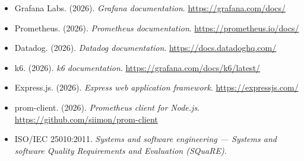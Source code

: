 \documentclass[12pt, a4paper]{article}
\begin{document}
\begin{itemize}
    \item Grafana Labs. (2026). \textit{Grafana documentation}. \url{https://grafana.com/docs/}
    
    \item Prometheus. (2026). \textit{Prometheus documentation}. \url{https://prometheus.io/docs/}
    
    \item Datadog. (2026). \textit{Datadog documentation}. \url{https://docs.datadoghq.com/}
    
    \item k6. (2026). \textit{k6 documentation}. \url{https://grafana.com/docs/k6/latest/}
    
    \item Express.js. (2026). \textit{Express web application framework}. \url{https://expressjs.com/}
    
    \item prom-client. (2026). \textit{Prometheus client for Node.js}. \url{https://github.com/siimon/prom-client}
    
    \item ISO/IEC 25010:2011. \textit{Systems and software engineering --- Systems and software Quality Requirements and Evaluation (SQuaRE)}.
\end{itemize}
\end{document}
